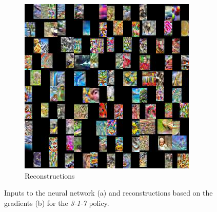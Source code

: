 \begin{figure}[hbt!]
\begin{subfigure}{.49\linewidth}
\includegraphics[width=\textwidth]{grids/data_cifar100_arch_ResNet20-4_epoch_200_optim_inversed_mode_aug_auglist_3-1-7_rlabel_False_reaugment_translate_clipped1_RECONSTRUCTIONS.png}
\caption{Reconstructions}%
\end{subfigure}%
\caption{Inputs to the neural network (a) and reconstructions based on the gradients (b) for the \textit{3-1-7} policy.}
    \label{fig:apprr5}
\end{figure}


